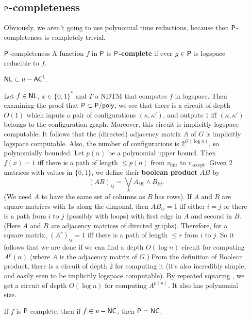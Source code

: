 \documentclass{article}
\begin{document}
\subsection{$\mathsf{P}$-completeness}
Obviously, we aren't going to use polynomial time reductions, because then $\mathsf{P}$-completeness is completely trivial. 
\begin{fancydefine}{$\mathsf{P}$-completeness}
    A function $f$ in $\mathsf{P}$ is $\mathsf{P}$\textbf{-complete} if ever $g \in \mathsf{P}$ is logspace reducible to $f$.
\end{fancydefine}
\begin{fancylem}{}
    $\mathsf{NL} \subset u-\mathsf{AC}^{1}$.
\end{fancylem}
\proof Let $f \in \mathsf{NL}$, $x \in \{0,1\}^{*}$ and $T$ a NDTM that computes $f$ in logspace. Then examining the proof that $\mathsf{P} \subset \mathsf{P/poly}$, we see that there is a circuit of depth $O(1)$ which inputs a pair of configurations $(\kappa, \kappa')$, and outputs $1$ iff $(\kappa, \kappa')$ belongs to the configuration graph. Moreover, this circuit is implicitly logspace computable. \gap It follows that the (directed) adjacency matrix $A$ of $G$ is implicitly logspace computable. Also, the number of configurations is $2^{O(\log n)}$, so polynomially bounded. Let $p(n)$ be a polynomial upper bound. Then $f(x) = 1$ iff there is a path of length $\leq p(n)$ from $v_{\text{init}}$ to $v_{\text{accept}}$.\gap 
Given $2$ matrices with values in $\{0,1\}$, we define their \textbf{boolean product} $AB$ by \[ (AB)_{ij}= \bigvee_{k} A_{iK} \wedge B_{kj}.\] (We need $A$ to have the same set of columns as $B$ has rows). If $A$ and $B$ are square matrices with 1s along the diagonal, then $AB_{ij}=1$ iff either $i=j$ or there is a path from $i$ to $j$ (possibly with loops) with first edge in $A$ and second in $B$. (Here $A$ and $B$ are adjacency matrices of directed graphs). Therefore, for a square matrix, $(A^{r})_{ij}=1$ iff there is a path of length $\leq r$ from $i$ to $j$. So it follows that we are done if we can find a depth $O(\log n)$ circuit for computing $A^p(n)$ (where $A$ is the adjacency matrix of $G$.)\gap 
From the definition of Boolean product, there is a circuit of depth $2$ for computing it (it's also incredibly simple, and easily seen to be implicitly logspace computable). By repeated squaring %
, we get a circuit of depth $O(\log n)$ for computing $A^{p(n)}$. It also has polynomial size. \endproof 
\begin{corr}{}
    If $f$ is $\mathsf{P}$-complete, then if $f \in u-\mathsf{NC}$, then $\mathsf{P}=\mathsf{NC}$.
\end{corr}
\end{document}
